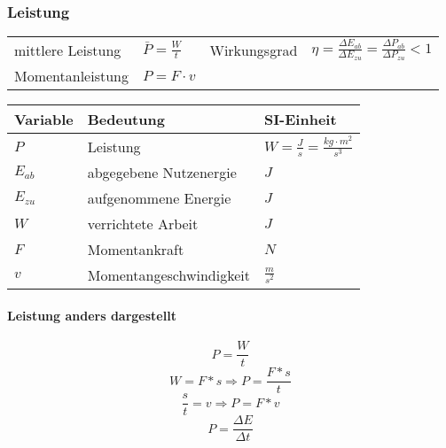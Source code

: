 \subsubsection{Leistung}

\begin{tabbing}
	\begin{tabu} to \linewidth {l X l X}
		\toprule
		mittlere Leistung & $\bar{P} = \frac{W}{t}$ &
		Wirkungsgrad & $\eta = \frac{\Delta E_{ab}}{\Delta E_{zu}} = \frac{\Delta P_{ab}}{\Delta P_{zu}} < 1$ \\
		Momentanleistung & $P = F \cdot v$ & & \\
	\end{tabu}
\end{tabbing}

\begin{tabbing}
	\begin{tabu} to \linewidth {l X l}
		Variable & Bedeutung & SI-Einheit \\
		\midrule
		$P$ & Leistung & $W = \frac{J}{s} = \frac{kg \cdot m^2}{s^3}$ \\
		$E_{ab}$ & abgegebene Nutzenergie & $J$ \\
		$E_{zu}$ & aufgenommene Energie &  $J$ \\
		$W$ & verrichtete Arbeit &  $J$ \\
		$F$ & Momentankraft &  $N$ \\
		$v$ & Momentangeschwindigkeit &  $\frac{m}{s^2}$ \\
		\bottomrule
	\end{tabu}
\end{tabbing}

\paragraph{Leistung anders dargestellt}

$$P = \frac{W}{t}$$
$$W = F*s \Rightarrow P = \frac{F*s}{t}$$
$$\frac{s}{t} = v \Rightarrow P = F*v$$
$$P=\frac{\Delta E}{\Delta t}$$